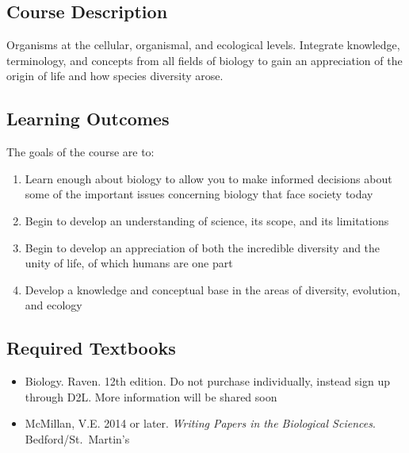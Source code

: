 \documentclass{tufte-handout}
\begin{document}
\begin{fullwidth}

\section{Course Description}

Organisms at the cellular, organismal, and ecological levels. Integrate knowledge, terminology, and concepts from all fields of biology to gain an appreciation of the origin of life and how species diversity arose.

\subsection{Learning Outcomes}

The goals of the course are to:


\begin{enumerate}
	\item Learn enough about biology to allow you to make informed decisions about some of the important issues concerning biology that face society today
	\item Begin to develop an understanding of science, its scope, and its limitations
	\item Begin to develop an appreciation of both the incredible diversity and the unity of life, of which humans are one part
	\item Develop a knowledge and conceptual base in the areas of diversity, evolution, and ecology
\end{enumerate}

\subsection{Required Textbooks}

\begin{itemize}
	\item Biology. Raven. 12th edition. Do not purchase individually, instead sign up through D2L. More information will be shared soon
	\item McMillan, V.E. 2014 or later. \emph{Writing Papers in the Biological Sciences}. Bedford/St.\ Martin's
\end{itemize}



\end{fullwidth}
\end{document}
